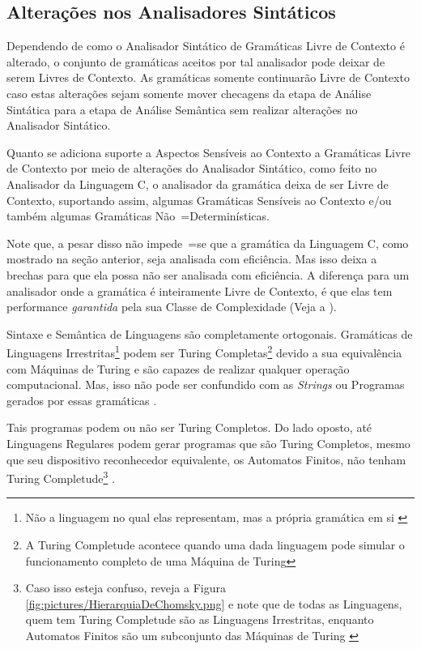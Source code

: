 {\subsection{Alterações nos Analisadores Sintáticos}

    Dependendo de como o Analisador Sintático de Gramáticas Livre de Contexto é alterado,
    o conjunto de gramáticas aceitos por tal analisador pode deixar de serem Livres de Contexto.
    As gramáticas somente continuarão Livre de Contexto caso estas alterações sejam somente mover checagens da etapa de Análise Sintática para a etapa de Análise Semântica sem realizar alterações no Analisador Sintático.

    Quanto se adiciona suporte a Aspectos Sensíveis ao Contexto \cite{contextSensitiveParsing} a Gramáticas Livre de Contexto por meio de alterações do Analisador Sintático,
    como feito no Analisador da Linguagem C,
    o analisador da gramática deixa de ser Livre de Contexto,
    suportando assim,
    algumas Gramáticas Sensíveis ao Contexto e\slash{}ou também algumas Gramáticas Não~=Determinísticas.

    Note que,
    a pesar disso não impede~=se que a gramática da Linguagem C,
    como mostrado na seção anterior,
    seja analisada com eficiência.
    Mas isso deixa a brechas para que ela possa não ser analisada com eficiência.
    A diferença para um analisador onde a gramática é inteiramente Livre de Contexto,
    é que elas tem performance \textit{garantida} pela sua Classe de Complexidade (Veja a ).

    Sintaxe e
    Semântica de Linguagens são completamente ortogonais.
    Gramáticas de Linguagens Irrestritas\footnote{
    Não a linguagem no qual elas representam,
    mas a própria gramática em si \cite{finiteAutomataTuringComplete}
    }
    podem ser Turing Completas\footnote{
    A Turing Completude acontece quando uma dada linguagem pode simular o funcionamento completo de uma Máquina de Turing
    }
    devido a sua equivalência com Máquinas de Turing e
    são capazes de realizar qualquer operação computacional.
    Mas,
    isso não pode ser confundido com as \textit{Strings} ou
    Programas gerados por essas gramáticas \cite{areThereDomainSpecificLanguages}.

    Tais programas podem ou
    não ser Turing Completos.
    Do lado oposto,
    até Linguagens Regulares podem gerar programas que são Turing Completos,
    mesmo que seu dispositivo reconhecedor equivalente,
    os Automatos Finitos,
    não tenham Turing Completude\footnote{
    Caso isso esteja confuso,
    reveja a Figura \ref{fig:pictures/HierarquiaDeChomsky.png} e
    note que de todas as Linguagens,
    quem tem Turing Completude são as Linguagens Irrestritas,
    enquanto Automatos Finitos são um subconjunto das Máquinas de Turing \cite{finiteAutomataTuringComplete}
    }
    \cite{turingCompleteRegularLanguages,finiteAutomataTuringComplete}.

}
